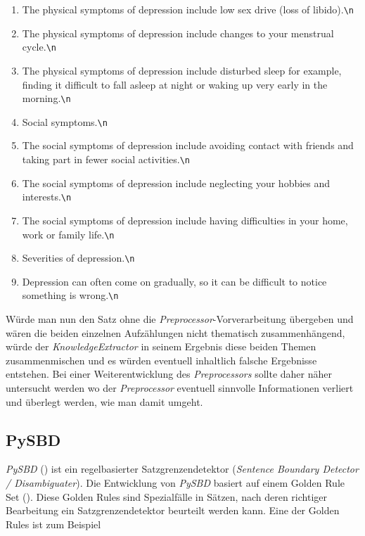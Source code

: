 \begin{enumerate}
	\item \glqq The physical symptoms of depression include low sex drive (loss of libido).\verb!\n!\grqq
	\item \glqq The physical symptoms of depression include changes to your menstrual cycle.\verb!\n!\grqq
	\item \glqq The physical symptoms of depression include disturbed sleep for example, finding it difficult to fall asleep at night or waking up very early in the morning.\verb!\n!\grqq
	\item \glqq Social symptoms.\verb!\n!\grqq
	\item \glqq The social symptoms of depression include avoiding contact with friends and taking part in fewer social activities.\verb!\n!\grqq
	\item \glqq The social symptoms of depression include neglecting your hobbies and interests.\verb!\n!\grqq
	\item \glqq The social symptoms of depression include having difficulties in your home, work or family life.\verb!\n!\grqq
	\item \glqq Severities of depression.\verb!\n!\grqq
	\item \glqq Depression can often come on gradually, so it can be difficult to notice something is wrong.\verb!\n!\grqq 
\end{enumerate}

Würde man nun den Satz ohne die \emph{Preprocessor}-Vorverarbeitung übergeben und wären die beiden einzelnen Aufzählungen nicht thematisch zusammenhängend, würde der \emph{KnowledgeExtractor} in seinem Ergebnis diese beiden Themen zusammenmischen und es würden eventuell inhaltlich falsche Ergebnisse entstehen. Bei einer Weiterentwicklung des \emph{Preprocessors} sollte daher näher untersucht werden wo der \emph{Preprocessor} eventuell sinnvolle Informationen verliert und überlegt werden, wie man damit umgeht.

\subsection{PySBD}
\label{evaluation_pysbd}
\emph{PySBD} (\cite{sadvilkar_pysbd_2020}) ist ein regelbasierter Satzgrenzendetektor (\emph{Sentence Boundary Detector / Disambiguater}). Die Entwicklung von \emph{PySBD} basiert auf einem Golden Rule Set (\cite{golden_rules}). Diese Golden Rules sind Spezialfälle in Sätzen, nach deren richtiger Bearbeitung ein Satzgrenzendetektor beurteilt werden kann. Eine der Golden Rules ist zum Beispiel\\

